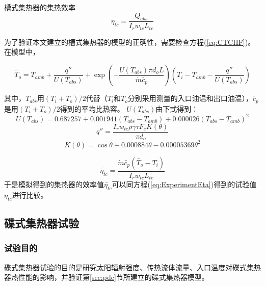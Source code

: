 槽式集热器的集热效率
\begin{equation}
	\eta_{tc} = \dfrac{Q_{abs}}{I_rw_{tc}L_{tc}}
	\label{eq:ExperimentEta}
\end{equation}

为了验证本文建立的槽式集热器的模型的正确性，需要检查方程(\ref{eq:CTCHF})。在模型中，

\begin{equation}
	\widetilde{T_{o}}=T_{amb} + \dfrac{q''}{U(T_{abs})} + \exp(-\frac{U(T_{abs})\pi d_o L}{\dot{m}\widetilde{c_p}})(T_{i}-T_{amb}-\dfrac{q''}{U(T_{abs})})
	\label{eq:CheckT_o}
\end{equation}

其中，$T_{abs}$用$(T_i + T_o)/2$代替（$T_i$和$T_o$分别采用测量的入口油温和出口油温），$\widetilde{c_p}$是用$(T_i + T_o)/2$得到的平均比热容。
$U(T_{abs})$由下式得到\cite{Romero2007}：
\begin{equation}
	U(T_{abs}) = 0.687257 + 0.001941(T_{abs} - T_{amb}) + 0.000026(T_{abs} - T_{amb})^2
	\label{eq:U_T_abs}
\end{equation}
\begin{equation}
	q'' = \frac{I_r w_{tc} \rho \gamma \tau F_e K(\theta)}{\pi d_o}
\end{equation}
\begin{equation}
	K(\theta) = \cos\theta+0.000884\theta-0.00005369\theta^2
\end{equation}

\begin{equation}
	\widetilde{\eta_{tc}} = \dfrac{\dot{m}\widetilde{c_p}(\widetilde{T_o}-T_i)}{I_rw_{tc}L_{tc}}
\end{equation}
于是模拟得到的集热器的效率值$\widetilde{\eta_{tc}}$可以同方程(\ref{eq:ExperimentEta})得到的试验值$\eta_{tc}$进行比较。

	
\subsection{碟式集热器试验}
\subsubsection{试验目的}
碟式集热器试验的目的是研究太阳辐射强度、传热流体流量、入口温度对碟式集热器热性能的影响，并验证第\ref{sec:pdc}节所建立的碟式集热器模型。

